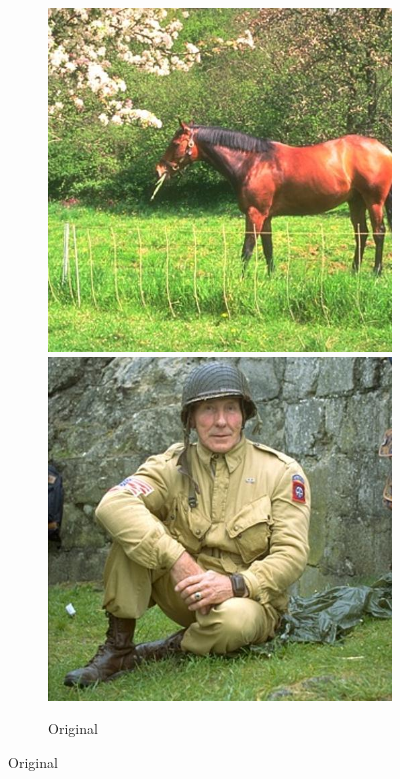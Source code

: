\documentclass[11pt,a4paper]{article}
\begin{document}
\begin{figure}
\begin{subfigure}[b]{0.3\textwidth}
        \includegraphics[width=\textwidth]{figures/dino/tile_1/291000.jpg}
        \includegraphics[width=\textwidth]{figures/dino/tile_1/376043.jpg}
        \caption{Original}

\end{subfigure}
\end{figure}
\end{document}
